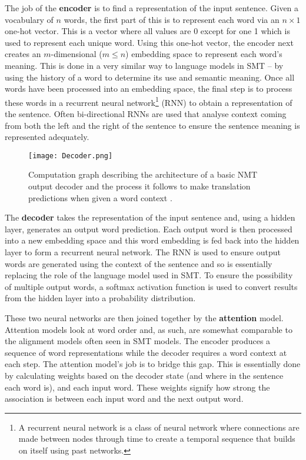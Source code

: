 \documentclass[11pt]{article}
\begin{document}
The job of the \textbf{encoder} is to find a representation of the input sentence. Given a vocabulary of $n$ words, the first part of this is to represent each word via an $n \times 1$ one-hot vector. This is a vector where all values are 0 except for one 1 which is used to represent each unique word. Using this one-hot vector, the encoder next creates an $m$-dimensional ($m \leq n$) embedding space to represent each word's meaning. This is done in a very similar way to language models in SMT -- by using the history of a word to determine its use and semantic meaning. Once all words have been processed into an embedding space, the final step is to process these words in a recurrent neural network\footnote{A recurrent neural network is a class of neural network where connections are made between nodes through time to create a temporal sequence that builds on itself using past networks.} (RNN) to obtain a representation of the sentence. Often bi-directional RNNs are used that analyse context coming from both the left and the right of the sentence to ensure the sentence meaning is represented adequately.


\bigskip

\begin{figure}[h]
    \centering
    \texttt{[image: Decoder.png]}
    \caption{Computation graph describing the architecture of a basic NMT output decoder and the process it follows to make translation predictions when given a word context \citep[p. 128]{koehn2020}.}
    \label{fig:decoder}
\end{figure}

The \textbf{decoder} takes the representation of the input sentence and, using a hidden layer, generates an output word prediction. Each output word is then processed into a new embedding space and this word embedding is fed back into the hidden layer to form a recurrent neural network. The RNN is used to ensure output words are generated using the context of the sentence and so is essentially replacing the role of the language model used in SMT. To ensure the possibility of multiple output words, a softmax activation function is used to convert results from the hidden layer into a probability distribution.

\bigskip

These two neural networks are then joined together by the \textbf{attention} model. Attention models look at word order and, as such, are somewhat comparable to the alignment models often seen in SMT models. The encoder produces a sequence of word representations while the decoder requires a word context at each step. The attention model’s job is to bridge this gap. This is essentially done by calculating weights based on the decoder state (and where in the sentence each word is), and each input word. These weights signify how strong the association is between each input word and the next output word.
\end{document}
